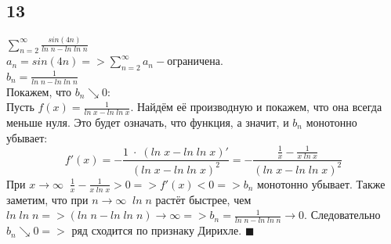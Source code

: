 \documentclass[a4paper,fleqn]{article}
\begin{document}
    \subsection*{13}
    $\displaystyle \sum\limits_{n = 2}^{\infty} \frac{sin(4n)}{ln \; n - ln \; ln \; n}$ \\
    $\displaystyle a_n = sin(4n) => \sum\limits_{n = 2}^{\infty} a_n - \text{ограничена}$. \\
    $\displaystyle b_n = \frac{1}{ln \; n - ln \; ln \; n}$ \\
    Покажем, что $\displaystyle b_n \searrow 0$: \\
    Пусть $\displaystyle f(x) = \frac{1}{ln \; x - ln \; ln \; x}$. Найдём её производную и покажем, что она всегда меньше нуля. Это будет означать, что функция, а значит, и $\displaystyle b_n$ монотонно убывает: \\
    \begin{equation*} f'(x) = -\frac{1 \; \cdot \; (ln \; x - ln \; ln \; x)'}{(ln \; x - ln \; ln \; x)^2} = -\frac{\frac{1}{x} - \frac{1}{x\; ln \; x}}{(ln \; x - ln \; ln \; x)^2} \end{equation*}
    При $\displaystyle x \rightarrow \infty \; \; \frac{1}{x} - \frac{1}{x\; ln \; x} > 0 => f'(x) < 0 => b_n$ монотонно убывает. Также заметим, что при $\displaystyle n \rightarrow \infty \; \; ln \; n$ растёт быстрее, чем $ln\; ln\; n => (ln \; n - ln \; ln \; n) \rightarrow \infty => b_n = \frac{1}{ln \; n - ln \; ln \; n} \rightarrow 0$. Следовательно $\displaystyle b_n \searrow 0 =>$ ряд сходится по признаку Дирихле. $\displaystyle \blacksquare$ \\


\end{document}
